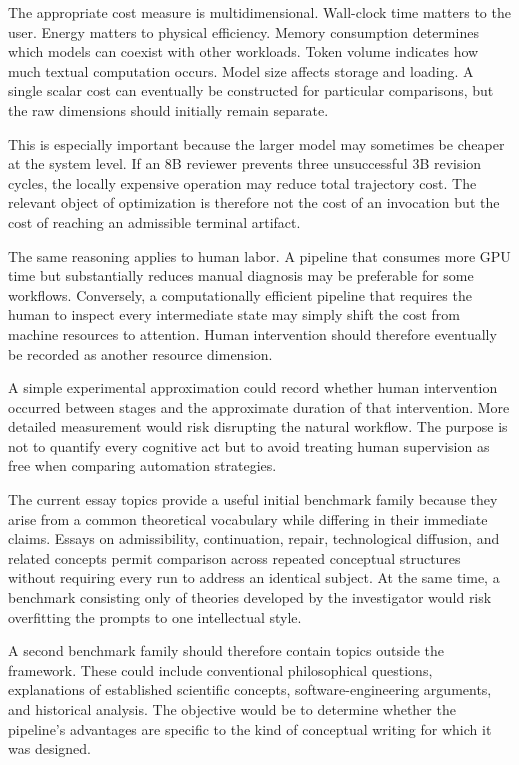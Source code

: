 \documentclass[11pt]{article}
\begin{document}
The appropriate cost measure is multidimensional. Wall-clock time matters to the user. Energy matters to physical efficiency. Memory consumption determines which models can coexist with other workloads. Token volume indicates how much textual computation occurs. Model size affects storage and loading. A single scalar cost can eventually be constructed for particular comparisons, but the raw dimensions should initially remain separate.

This is especially important because the larger model may sometimes be cheaper at the system level. If an 8B reviewer prevents three unsuccessful 3B revision cycles, the locally expensive operation may reduce total trajectory cost. The relevant object of optimization is therefore not the cost of an invocation but the cost of reaching an admissible terminal artifact.

The same reasoning applies to human labor. A pipeline that consumes more GPU time but substantially reduces manual diagnosis may be preferable for some workflows. Conversely, a computationally efficient pipeline that requires the human to inspect every intermediate state may simply shift the cost from machine resources to attention. Human intervention should therefore eventually be recorded as another resource dimension.

A simple experimental approximation could record whether human intervention occurred between stages and the approximate duration of that intervention. More detailed measurement would risk disrupting the natural workflow. The purpose is not to quantify every cognitive act but to avoid treating human supervision as free when comparing automation strategies.

The current essay topics provide a useful initial benchmark family because they arise from a common theoretical vocabulary while differing in their immediate claims. Essays on admissibility, continuation, repair, technological diffusion, and related concepts permit comparison across repeated conceptual structures without requiring every run to address an identical subject. At the same time, a benchmark consisting only of theories developed by the investigator would risk overfitting the prompts to one intellectual style.

A second benchmark family should therefore contain topics outside the framework. These could include conventional philosophical questions, explanations of established scientific concepts, software-engineering arguments, and historical analysis. The objective would be to determine whether the pipeline's advantages are specific to the kind of conceptual writing for which it was designed.
\end{document}
